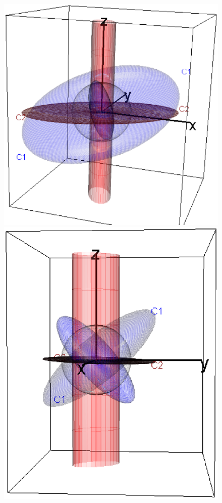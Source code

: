 \begin{figure}[htb]
 \begin{minipage}[b]{.49\linewidth}
  \centering
  \includegraphics[width=1\linewidth]{fig/gell3d-1}
 \end{minipage}%
 \hfill
 \begin{minipage}[b]{.49\linewidth}
  \centering
  \includegraphics[width=1\linewidth]{fig/gell3d-4}

\end{minipage}
\end{figure}
